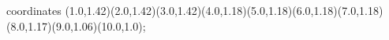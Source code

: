					coordinates { (1.0,1.42)(2.0,1.42)(3.0,1.42)(4.0,1.18)(5.0,1.18)(6.0,1.18)(7.0,1.18)(8.0,1.17)(9.0,1.06)(10.0,1.0)};